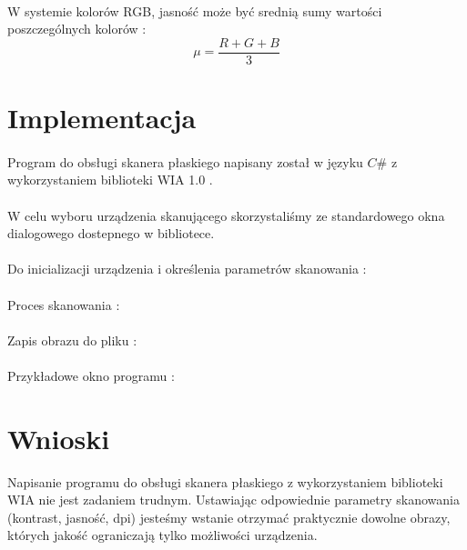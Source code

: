 \documentclass[wide,a4paper,titlepage,12pt] {article}
\begin{document}
\paragraph{} %
\label{par:}
W systemie kolorów RGB, jasność może być srednią sumy wartości poszczególnych kolorów :
\begin{equation}
    \mu = \frac{R+G+B}{3}
\end{equation}
\section{Implementacja}
\paragraph{} %
\label{par:}
Program do obsługi skanera płaskiego napisany został w języku $C\#$ z wykorzystaniem biblioteki WIA 1.0 .

\paragraph{} %
\label{}
W celu wyboru urządzenia skanującego skorzystaliśmy ze standardowego okna dialogowego dostepnego w bibliotece.


\paragraph{}
Do inicializacji urządzenia i określenia parametrów skanowania : 

\paragraph{} %
\label{par:}
Proces skanowania :

\paragraph{} %
\label{par:}
Zapis obrazu do pliku :

\paragraph{} %
\label{par:}
Przykładowe okno programu :


\section{Wnioski}
Napisanie programu do obsługi skanera płaskiego z wykorzystaniem biblioteki WIA nie jest zadaniem trudnym. Ustawiając odpowiednie parametry skanowania (kontrast, jasność, dpi) jesteśmy wstanie otrzymać praktycznie dowolne obrazy, których jakość ograniczają tylko możliwości urządzenia.
\paragraph{}
\end{document}
